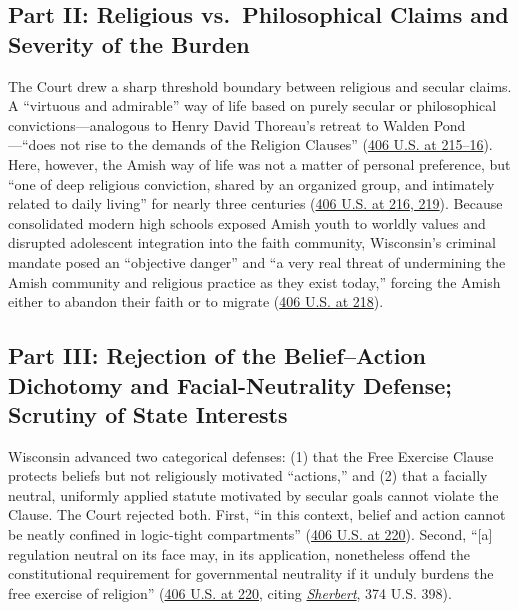 \documentclass[12pt]{article}
\begin{document}
\subsection{Part II: Religious vs.\ Philosophical Claims and Severity of the Burden}

The Court drew a sharp threshold boundary between religious and secular claims. A ``virtuous and admirable'' way of life based on purely secular or philosophical convictions---analogous to Henry David Thoreau's retreat to Walden Pond---``does not rise to the demands of the Religion Clauses'' (\href{https://supreme.justia.com/cases/federal/us/406/205/}{406 U.S. at 215--16}). Here, however, the Amish way of life was not a matter of personal preference, but ``one of deep religious conviction, shared by an organized group, and intimately related to daily living'' for nearly three centuries (\href{https://supreme.justia.com/cases/federal/us/406/205/}{406 U.S. at 216, 219}). Because consolidated modern high schools exposed Amish youth to worldly values and disrupted adolescent integration into the faith community, Wisconsin's criminal mandate posed an ``objective danger'' and ``a very real threat of undermining the Amish community and religious practice as they exist today,'' forcing the Amish either to abandon their faith or to migrate (\href{https://supreme.justia.com/cases/federal/us/406/205/}{406 U.S. at 218}).

\subsection{Part III: Rejection of the Belief--Action Dichotomy and Facial-Neutrality Defense; Scrutiny of State Interests}

Wisconsin advanced two categorical defenses: (1) that the Free Exercise Clause protects beliefs but not religiously motivated ``actions,'' and (2) that a facially neutral, uniformly applied statute motivated by secular goals cannot violate the Clause. The Court rejected both. First, ``in this context, belief and action cannot be neatly confined in logic-tight compartments'' (\href{https://supreme.justia.com/cases/federal/us/406/205/}{406 U.S. at 220}). Second, ``[a] regulation neutral on its face may, in its application, nonetheless offend the constitutional requirement for governmental neutrality if it unduly burdens the free exercise of religion'' (\href{https://supreme.justia.com/cases/federal/us/406/205/}{406 U.S. at 220}, citing \href{https://supreme.justia.com/cases/federal/us/374/398/}{\emph{Sherbert}}, 374 U.S. 398).
\end{document}
